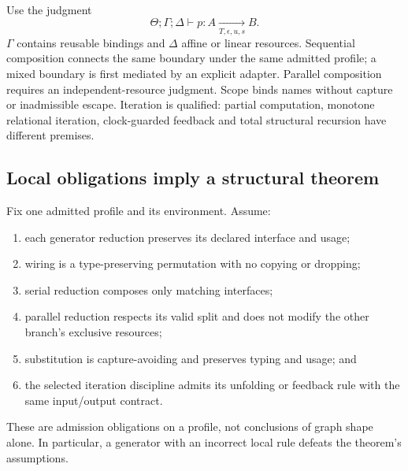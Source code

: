 \documentclass[11pt]{article}
\theoremstyle{remark}
\begin{document}
Use the judgment
\[
 \Theta;\Gamma;\Delta\vdash p:A
 \xrightarrow[T,\epsilon,u,s]{}B.
\]
$\Gamma$ contains reusable bindings and $\Delta$ affine or linear resources.
Sequential composition connects the same boundary under the same admitted
profile; a mixed boundary is first mediated by an explicit adapter. Parallel
composition requires an independent-resource judgment. Scope binds names
without capture or inadmissible escape. Iteration is qualified: partial
computation, monotone relational iteration, clock-guarded feedback and total
structural recursion have different premises.

\subsection{Local obligations imply a structural theorem}

Fix one admitted profile and its environment. Assume:
\begin{enumerate}
\item each generator reduction preserves its declared interface and usage;
\item wiring is a type-preserving permutation with no copying or dropping;
\item serial reduction composes only matching interfaces;
\item parallel reduction respects its valid split and does not modify the
  other branch's exclusive resources;
\item substitution is capture-avoiding and preserves typing and usage; and
\item the selected iteration discipline admits its unfolding or feedback
  rule with the same input/output contract.
\end{enumerate}
These are admission obligations on a profile, not conclusions of graph
shape alone. In particular, a generator with an incorrect local rule defeats
the theorem's assumptions.
\end{document}
